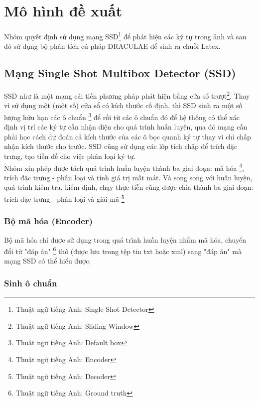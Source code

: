 \documentclass[a4paper,12pt]{article}
\begin{document}
	
	\newpage
	\section{Mô hình đề xuất}
	
	Nhóm quyết định sử dụng mạng SSD\footnote{Thuật ngữ tiếng Anh: Single Shot Detector} để phát hiện các ký tự trong ảnh và sau đó sử dụng bộ phân tích cú pháp DRACULAE để sinh ra chuỗi Latex.
	
	\subsection{Mạng Single Shot Multibox Detector (SSD)}
	
	SSD như là một mạng cải tiến phương pháp phát hiện bằng cửa sổ trượt\footnote{Thuật ngữ tiếng Anh: Sliding Window}. Thay vì sử dụng một (một số) cửa sổ có kích thước cố định, thì SSD sinh ra một số lượng hữu hạn các ô chuẩn \footnote{Thuật ngữ tiếng Anh: Default box} để rồi từ các ô chuẩn đó để hệ thống có thể xác định vị trí các ký tự cần nhận diện cho quá trình huấn luyện, qua đó mạng cần phải học cách dự đoán cả kích thước của các ô bọc quanh ký tự thay vì chỉ chấp nhận kích thước cho trước. SSD cũng sử dụng các lớp tích chập để trích đặc trưng, tạo tiền đề cho việc phân loại ký tự. \\
	
	Nhóm xin phép được tách quá trình huấn luyện thành ba giai đoạn: mã hóa \footnote{Thuật ngữ tiếng Anh: Encoder}, trích đặc trưng - phân loại và tính giá trị mất mát. Và song song với huấn luyện, quá trình kiểm tra, kiểm định, chạy thực tiễn cũng được chia thành ba giai đoạn: trích đặc trưng - phân loại và giải mã \footnote{Thuật ngữ tiếng Anh: Decoder}
	
	\subsubsection{Bộ mã hóa (Encoder)}
	Bộ mã hóa chỉ được sử dụng trong quá trình huấn luyện nhằm mã hóa, chuyển đổi từ "đáp án" \footnote{Thuật ngữ tiếng Anh: Ground truth} thô (được lưu trong tệp tin txt hoặc xml) sang "đáp án" mà mạng SSD có thể hiểu được.
	
	\subsubsection*{Sinh ô chuẩn}
	
\end{document}
